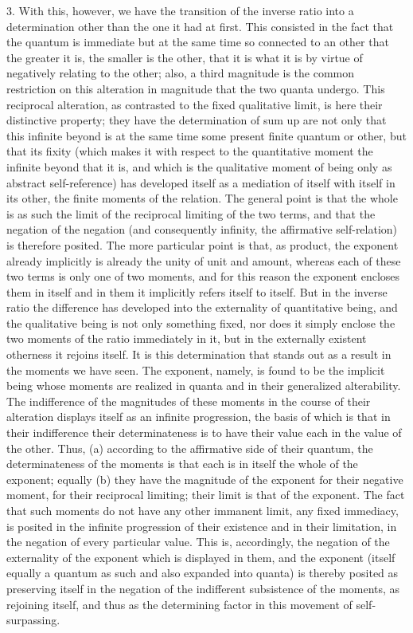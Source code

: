 3. With this, however, we have
the transition of the inverse ratio
into a determination other than
the one it had at first.
This consisted in the fact that
the quantum is immediate
but at the same time so connected to
an other that the greater it is,
the smaller is the other,
that it is what it is by virtue of
negatively relating to the other;
also, a third magnitude is the
common restriction on this alteration
in magnitude that the two quanta undergo.
This reciprocal alteration,
as contrasted to the fixed qualitative limit,
is here their distinctive property;
they have the determination of
sum up are not only that this infinite beyond is
at the same time some present finite quantum or other,
but that its fixity
(which makes it with respect to the quantitative moment
the infinite beyond that it is,
and which is the qualitative moment of
being only as abstract self-reference)
has developed itself as a mediation
of itself with itself in its other,
the finite moments of the relation.
The general point is that the whole is as
such the limit of the reciprocal limiting of the two terms,
and that the negation of the negation
(and consequently infinity, the affirmative self-relation)
is therefore posited.
The more particular point is that, as product,
the exponent already implicitly is already
the unity of unit and amount,
whereas each of these two terms is
only one of two moments,
and for this reason the exponent encloses them in itself
and in them it implicitly refers itself to itself.
But in the inverse ratio the difference has developed
into the externality of quantitative being,
and the qualitative being is not only something fixed,
nor does it simply enclose the two moments
of the ratio immediately in it,
but in the externally existent otherness it rejoins itself.
It is this determination that stands out as a result
in the moments we have seen.
The exponent, namely, is found to be
the implicit being whose moments are realized in quanta
and in their generalized alterability.
The indifference of the magnitudes of these moments in the course of their
alteration displays itself as an infinite progression,
the basis of which is that in their indifference
their determinateness is to have their value
each in the value of the other.
Thus, (a) according to the affirmative side of their quantum,
the determinateness of the moments is that each is in itself
the whole of the exponent;
equally (b) they have the magnitude of the
exponent for their negative moment, for their reciprocal limiting;
their limit is that of the exponent.
The fact that such moments do not have any other immanent limit,
any fixed immediacy, is posited in the infinite progression
of their existence and in their limitation,
in the negation of every particular value.
This is, accordingly, the negation of the externality
of the exponent which is displayed in them, and the exponent
(itself equally a quantum as such and also expanded into quanta)
is thereby posited as preserving itself
in the negation of the indifferent subsistence of the moments,
as rejoining itself, and thus as the determining factor
in this movement of self-surpassing.

